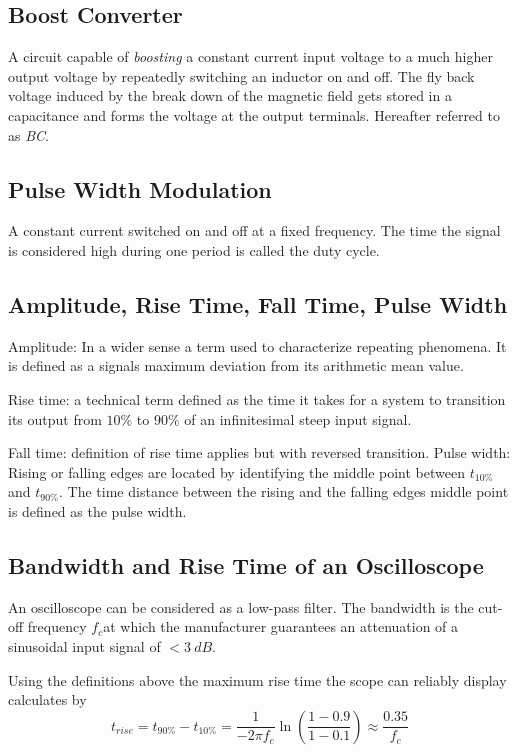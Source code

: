     \subsection*{Boost Converter}
        A circuit capable of \textit{boosting} a constant current input voltage to a much higher output voltage by repeatedly
        switching an inductor on and off. The fly back voltage induced by the break down of the magnetic field gets stored in
        a capacitance and forms the voltage at the output terminals. Hereafter referred to as \textit{BC}.
    \subsection*{Pulse Width Modulation}
        A constant current switched on and off at a fixed frequency. The time the signal is considered high during one period
        is called the duty cycle.
    \subsection*{Amplitude, Rise Time, Fall Time, Pulse Width}
        Amplitude: In a wider sense a term used to characterize repeating phenomena. It is defined as a signals maximum deviation
        from its arithmetic mean value.\par
        Rise time: a technical term defined as the time it takes for a system to transition its output from \( 10\% \) to \( 90\% \)
        of an infinitesimal steep input signal.\par
        Fall time: definition of rise time applies but with reversed transition.
        Pulse width: Rising or falling edges are located by identifying the middle point between \( t_{10\%} \) and \( t_{90\%} \).
        The time distance between the rising and the falling edges middle point is defined as the pulse width.
    \subsection*{Bandwidth and Rise Time of an Oscilloscope}
        An oscilloscope can be considered as a low-pass filter. The bandwidth is the cut-off frequency \( f_c \)at which the manufacturer
        guarantees an attenuation of a sinusoidal input signal of \( < \SI{3}{dB} \).\par
        Using the definitions above the maximum rise time the scope can reliably display calculates by
        \begin{equation}
            t_{rise} = t_{90\%} - t_{10\%} = \frac{1}{-2\pi f_c} \ln\left( \frac{1-0.9}{1-0.1} \right) \approx \frac{0.35}{f_c}
            \label{eq:bandwidth_and_riseTime}
        \end{equation}
